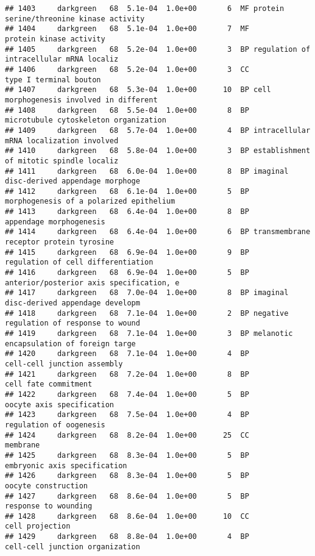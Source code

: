 \documentclass[]{article}
\begin{document}
\begin{verbatim}
## 1403     darkgreen   68  5.1e-04  1.0e+00       6  MF protein serine/threonine kinase activity
## 1404     darkgreen   68  5.1e-04  1.0e+00       7  MF                  protein kinase activity
## 1405     darkgreen   68  5.2e-04  1.0e+00       3  BP regulation of intracellular mRNA localiz
## 1406     darkgreen   68  5.2e-04  1.0e+00       3  CC                   type I terminal bouton
## 1407     darkgreen   68  5.3e-04  1.0e+00      10  BP cell morphogenesis involved in different
## 1408     darkgreen   68  5.5e-04  1.0e+00       8  BP    microtubule cytoskeleton organization
## 1409     darkgreen   68  5.7e-04  1.0e+00       4  BP intracellular mRNA localization involved
## 1410     darkgreen   68  5.8e-04  1.0e+00       3  BP establishment of mitotic spindle localiz
## 1411     darkgreen   68  6.0e-04  1.0e+00       8  BP imaginal disc-derived appendage morphoge
## 1412     darkgreen   68  6.1e-04  1.0e+00       5  BP  morphogenesis of a polarized epithelium
## 1413     darkgreen   68  6.4e-04  1.0e+00       8  BP                  appendage morphogenesis
## 1414     darkgreen   68  6.4e-04  1.0e+00       6  BP transmembrane receptor protein tyrosine 
## 1415     darkgreen   68  6.9e-04  1.0e+00       9  BP       regulation of cell differentiation
## 1416     darkgreen   68  6.9e-04  1.0e+00       5  BP anterior/posterior axis specification, e
## 1417     darkgreen   68  7.0e-04  1.0e+00       8  BP imaginal disc-derived appendage developm
## 1418     darkgreen   68  7.1e-04  1.0e+00       2  BP negative regulation of response to wound
## 1419     darkgreen   68  7.1e-04  1.0e+00       3  BP melanotic encapsulation of foreign targe
## 1420     darkgreen   68  7.1e-04  1.0e+00       4  BP              cell-cell junction assembly
## 1421     darkgreen   68  7.2e-04  1.0e+00       8  BP                     cell fate commitment
## 1422     darkgreen   68  7.4e-04  1.0e+00       5  BP                oocyte axis specification
## 1423     darkgreen   68  7.5e-04  1.0e+00       4  BP                  regulation of oogenesis
## 1424     darkgreen   68  8.2e-04  1.0e+00      25  CC                                 membrane
## 1425     darkgreen   68  8.3e-04  1.0e+00       5  BP             embryonic axis specification
## 1426     darkgreen   68  8.3e-04  1.0e+00       5  BP                      oocyte construction
## 1427     darkgreen   68  8.6e-04  1.0e+00       5  BP                     response to wounding
## 1428     darkgreen   68  8.6e-04  1.0e+00      10  CC                          cell projection
## 1429     darkgreen   68  8.8e-04  1.0e+00       4  BP          cell-cell junction organization

\end{verbatim}
\end{document}
